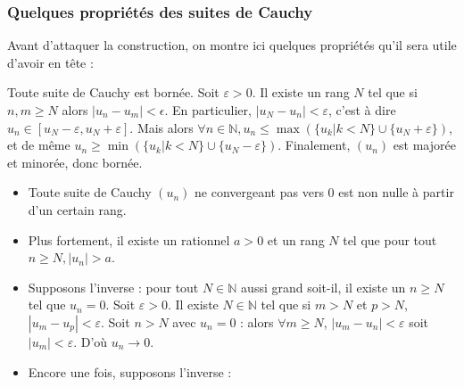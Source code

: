 \subsubsection{Quelques propriétés des suites de Cauchy}

Avant d'attaquer la construction, on montre ici quelques propriétés qu'il sera utile d'avoir en tête :

\begin{prop}
Toute suite de Cauchy est bornée.
\tcblower
Soit $\varepsilon>0$. Il existe un rang $N$ tel que si $n,m \geq N$ alors $|u_n-u_m|<\epsilon$. En particulier, $|u_N-u_n|<\varepsilon$, c'est à dire $u_n \in [u_N - \varepsilon, u_N + \varepsilon]$. Mais alors $\forall n \in \mathbb{N}, u_n \leq \max (\{ u_k | k < N\} \cup \{u_N+\varepsilon\})$, et de même $u_n \geq \min (\{ u_k | k < N\} \cup \{u_N-\varepsilon\})$. Finalement, $(u_n)$ est majorée et minorée, donc bornée.
\end{prop}

\begin{prop}
    \begin{itemize}
        \item Toute suite de Cauchy $(u_n)$ ne convergeant pas vers 0 est non nulle à partir d'un certain rang.
        \item Plus fortement, il existe un rationnel $a>0$ et un rang $N$ tel que pour tout $n\geq N, |u_n|>a$.
    \end{itemize}
    
    \tcblower
    \begin{itemize}
        \item Supposons l'inverse : pour tout $N \in \mathbb{N}$ aussi grand soit-il, il existe un $n\geq N$ tel que $u_n=0$. Soit $\varepsilon >0$. Il existe $N \in \mathbb{N}$ tel que si $m>N$ et $p>N$, $|u_m-u_p|<\varepsilon$. Soit $n>N$ avec $u_n=0$ : alors $\forall m \geq N$, $|u_m-u_n|<\varepsilon$ soit $|u_m|<\varepsilon$. D'où $u_n \to 0$.
        \item Encore une fois, supposons l'inverse : 
    \end{itemize} 
\end{prop}

